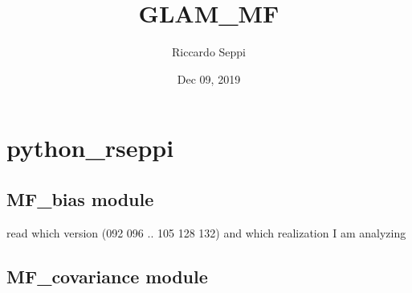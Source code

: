 \documentclass[letterpaper,10pt,english]{sphinxmanual}
\title{GLAM\_MF}
\date{Dec 09, 2019}
\author{Riccardo Seppi}
\begin{document}
\pagestyle{empty}
\sphinxmaketitle
\pagestyle{plain}
\sphinxtableofcontents
\pagestyle{normal}
\label{\detokenize{index::doc}}



\chapter{python\_rseppi}
\label{\detokenize{modules:python-rseppi}}\label{\detokenize{modules::doc}}

\section{MF\_bias module}
\label{\detokenize{MF_bias:module-MF_bias}}\label{\detokenize{MF_bias:mf-bias-module}}\label{\detokenize{MF_bias::doc}}

\begin{fulllineitems}
\label{\detokenize{MF_bias:MF_bias.main}}
read which version (092 096 .. 105 128 132) and which realization I am analyzing

\end{fulllineitems}



\section{MF\_covariance module}
\label{\detokenize{MF_covariance:module-MF_covariance}}\label{\detokenize{MF_covariance:mf-covariance-module}}\label{\detokenize{MF_covariance::doc}}

\begin{fulllineitems}
\label{\detokenize{MF_covariance:MF_covariance.halos_rebin}}
\end{fulllineitems}

\end{document}
